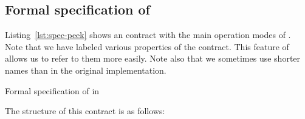 \subsection{Formal specification of \peek}
\label{sec:formal-specification-peek}

Listing~\ref{lst:spec-peek} shows an \acsl contract with the 
main operation modes of \peek.
Note that we have labeled various properties of the contract.
This feature of \acsl allows us to refer to them more easily.
Note also that we sometimes use shorter names than in the original implementation.

\begin{listing}[hbt]
\begin{minipage}{\textwidth}

\end{minipage}
\caption{\label{lst:spec-peek} Formal specification of \peek in \acsl}
\end{listing}

The structure of this contract is as follows:

